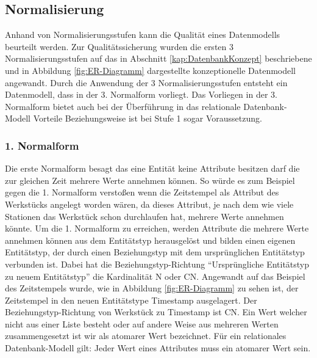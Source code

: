 \subsection{Normalisierung }\label{kap:Normalisierung}
Anhand von Normalisierungsstufen kann die Qualität eines Datenmodells beurteilt werden. Zur Qualitätssicherung wurden die ersten 3 Normalisierungsstufen auf das in Abschnitt \ref{kap:DatenbankKonzept} beschriebene und in Abbildung \ref{fig:ER-Diagramm} dargestellte konzeptionelle Datenmodell angewandt. Durch die Anwendung der 3 Normalisierungsstufen entsteht ein Datenmodell, dass in der 3. Normalform vorliegt. Das Vorliegen in der 3. Normalform bietet auch bei der Überführung in das relationale Datenbank-Modell Vorteile Beziehungsweise ist bei Stufe 1 sogar Voraussetzung.

\subsubsection*{1. Normalform}
Die erste Normalform besagt das eine Entität keine Attribute besitzen darf die zur gleichen Zeit mehrere Werte annehmen können. So würde es zum Beispiel gegen die 1. Normalform verstoßen wenn die Zeitstempel als Attribut des Werkstücks angelegt worden wären, da dieses Attribut, je nach dem wie viele Stationen das Werkstück schon durchlaufen hat, mehrere Werte annehmen könnte. Um die 1. Normalform zu erreichen, werden Attribute die mehrere Werte annehmen können aus dem Entitätstyp herausgelöst und bilden einen eigenen Entitätstyp, der durch einen Beziehungstyp mit dem ursprünglichen Entitätstyp verbunden ist. Dabei hat die Beziehungstyp-Richtung "`Ursprüngliche Entitätstyp zu neuem Entitätstyp"' die Kardinalität N oder CN.
Angewandt auf das Beispiel des Zeitstempels wurde, wie in Abbildung \ref{fig:ER-Diagramm} zu sehen ist, der Zeitstempel in den neuen Entitätstype Timestamp ausgelagert. Der Beziehungstyp-Richtung von Werkstück zu Timestamp ist CN.
Ein Wert welcher nicht aus einer Liste besteht oder auf andere Weise aus mehreren Werten zusammengesetzt ist wir als atomarer Wert bezeichnet. Für ein relationales Datenbank-Modell gilt: Jeder Wert eines Attributes muss ein atomarer Wert sein.\cite{Jarosch:2016}

